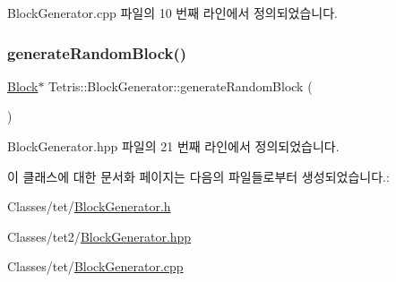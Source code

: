 Block\+Generator.\+cpp 파일의 10 번째 라인에서 정의되었습니다.

\mbox{\label{class_tetris_1_1_block_generator_a434df5baf3944a534492b63763b532a6}} 
\subsubsection{\texorpdfstring{generate\+Random\+Block()}{generateRandomBlock()}\hspace{0.1cm}{\footnotesize\ttfamily [2/2]}}
{\footnotesize\ttfamily \hyperlink{class_tetris_1_1_block}{Block}$\ast$ Tetris\+::\+Block\+Generator\+::generate\+Random\+Block (\begin{DoxyParamCaption}{ }\end{DoxyParamCaption})\hspace{0.3cm}{\ttfamily [inline]}}



Block\+Generator.\+hpp 파일의 21 번째 라인에서 정의되었습니다.



이 클래스에 대한 문서화 페이지는 다음의 파일들로부터 생성되었습니다.\+:\begin{DoxyCompactItemize}
\item 
Classes/tet/\hyperlink{_block_generator_8h}{Block\+Generator.\+h}\item 
Classes/tet2/\hyperlink{_block_generator_8hpp}{Block\+Generator.\+hpp}\item 
Classes/tet/\hyperlink{_block_generator_8cpp}{Block\+Generator.\+cpp}\end{DoxyCompactItemize}
